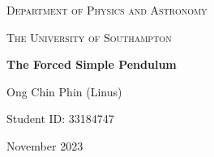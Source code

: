 \documentclass[10pt, twocolumn]{article}
\begin{document}
\begin{titlepage}
    \centering
    \vspace{1cm}
    {\scshape\Large Department of Physics and Astronomy \par}
    \vspace{1cm}
    {\scshape\Large The University of Southampton \par}
    \vspace{1cm}
    \vspace{1cm}
    {\huge\bfseries The Forced Simple Pendulum \par}
    \vspace{1cm}
    {\Large Ong Chin Phin (Linus) \par}
    \vspace{1cm}
    {\Large Student ID: 33184747 \par}
    \vfill
    {\large November 2023 \par}
\end{titlepage}

\newpage
\onecolumn
\tableofcontents
\thispagestyle{empty}
\clearpage

\newpage
\thispagestyle{empty}
\begin{abstract}

\end{abstract}

\twocolumn
\newpage
\setcounter{page}{1}
\end{document}
